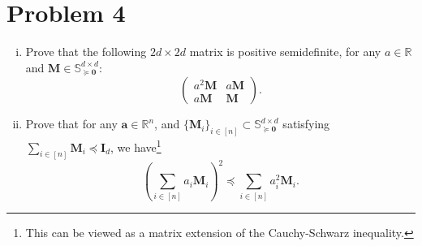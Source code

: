 \section*{Problem 4}

\begin{enumerate}[(i)]
    \item Prove that the following $2d \times 2d$ matrix is positive semidefinite, for any $a \in \mathbb{R}$ and $\mathbf{M} \in \mathbb{S}_{\succeq \mathbf{0}}^{d \times d}$:
    \[
    \begin{pmatrix} a^2 \mathbf{M} & a\mathbf{M} \\ a\mathbf{M} & \mathbf{M} \end{pmatrix}.
    \]

    \item Prove that for any $\mathbf{a} \in \mathbb{R}^n$, and $\{\mathbf{M}_i\}_{i \in [n]} \subset \mathbb{S}_{\succeq \mathbf{0}}^{d \times d}$ satisfying $\sum_{i \in [n]} \mathbf{M}_i \preceq \mathbf{I}_d$, we have\footnote{This can be viewed as a matrix extension of the Cauchy-Schwarz inequality.}
    \[
    \left( \sum_{i \in [n]} a_i \mathbf{M}_i \right)^2 \preceq \sum_{i \in [n]} a_i^2 \mathbf{M}_i.
    \]
\end{enumerate}
